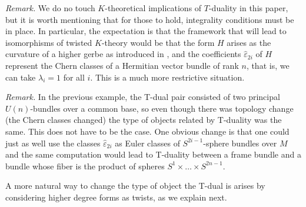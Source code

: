 \documentclass[12pt,twoside]{article}
\theoremstyle{plain}
\theoremstyle{definition}
\newenvironment{remark}%
{\vskip6pt%
\noindent%
{\it Remark.}}%
{\vskip6pt}
\numberwithin{equation}{section}
\begin{document}
\begin{remark}
We do no touch $K$-theoretical implications of $T$-duality in this paper, but it is worth mentioning that for those to hold, integrality conditions must be in place. In particular, the expectation is that the framework that will lead to isomorphisms of twisted $K$-theory would be that the form $H$ arises as the curvature of a higher gerbe as introduced in \cite{LSW16}, and the coefficients $\hat \varepsilon_{2i}$ of $H$ represent the Chern classes of a Hermitian vector bundle of rank $n$, that is, we can take $\lambda_i =1$ for all $i$. This is a much more restrictive situation.
\end{remark}

\begin{remark}
In the previous example, the T-dual pair consisted of two principal $U(n)$-bundles over a common base, so even though there was topology change (the Chern classes changed) the type of objects related by T-duality was the same. This does not have to be the case. One obvious change is that one could just as well use the classes $\hat{\varepsilon}_{2i}$ as Euler classes of $S^{2i-1}$-sphere bundles over $M$ and the same computation would lead to T-duality between a frame bundle and a bundle whose fiber is the product of spheres $S^1\times \dots \times S^{2n-1}$. 
\end{remark}

A more natural way to change the type of object the T-dual is arises by considering higher degree forms as twists, as we explain next.
\end{document}
